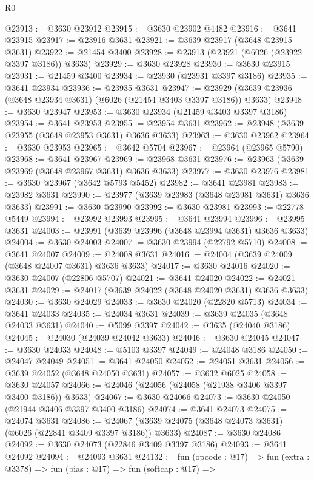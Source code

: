 \begin{lexlean}{R0}
\begin{coremodule}
@23913 := @3630 @23912
@23915 := @3630 @23902 @4482
@23916 := @3641 @23915
@23917 := @23916 @3631
@23921 := @3639 @23917 (@3648 @23915 @3631)
@23922 := @21454 @3400
@23928 := @23913 (@23921 (@6026 (@23922 @3397 @3186)) @3633)
@23929 := @3630 @23928
@23930 := @3630 @23915
@23931 := @21459 @3400
@23934 := @23930 (@23931 @3397 @3186)
@23935 := @3641 @23934
@23936 := @23935 @3631
@23947 := @23929 (@3639 @23936 (@3648 @23934 @3631) (@6026 (@21454 @3403 @3397 @3186)) @3633)
@23948 := @3630 @23947
@23953 := @3630 @23934 (@21459 @3403 @3397 @3186)
@23954 := @3641 @23953
@23955 := @23954 @3631
@23962 := @23948 (@3639 @23955 (@3648 @23953 @3631) @3636 @3633)
@23963 := @3630 @23962
@23964 := @3630 @23953
@23965 := @3642 @5704
@23967 := @23964 (@23965 @5790)
@23968 := @3641 @23967
@23969 := @23968 @3631
@23976 := @23963 (@3639 @23969 (@3648 @23967 @3631) @3636 @3633)
@23977 := @3630 @23976
@23981 := @3630 @23967 (@3642 @5793 @5452)
@23982 := @3641 @23981
@23983 := @23982 @3631
@23990 := @23977 (@3639 @23983 (@3648 @23981 @3631) @3636 @3633)
@23991 := @3630 @23990
@23992 := @3630 @23981
@23993 := @22778 @5449
@23994 := @23992 @23993
@23995 := @3641 @23994
@23996 := @23995 @3631
@24003 := @23991 (@3639 @23996 (@3648 @23994 @3631) @3636 @3633)
@24004 := @3630 @24003
@24007 := @3630 @23994 (@22792 @5710)
@24008 := @3641 @24007
@24009 := @24008 @3631
@24016 := @24004 (@3639 @24009 (@3648 @24007 @3631) @3636 @3633)
@24017 := @3630 @24016
@24020 := @3630 @24007 (@22806 @5707)
@24021 := @3641 @24020
@24022 := @24021 @3631
@24029 := @24017 (@3639 @24022 (@3648 @24020 @3631) @3636 @3633)
@24030 := @3630 @24029
@24033 := @3630 @24020 (@22820 @5713)
@24034 := @3641 @24033
@24035 := @24034 @3631
@24039 := @3639 @24035 (@3648 @24033 @3631)
@24040 := @5099 @3397
@24042 := @3635 (@24040 @3186)
@24045 := @24030 (@24039 @24042 @3633)
@24046 := @3630 @24045
@24047 := @3630 @24033
@24048 := @5103 @3397
@24049 := @24048 @3186
@24050 := @24047 @24049
@24051 := @3641 @24050
@24052 := @24051 @3631
@24056 := @3639 @24052 (@3648 @24050 @3631)
@24057 := @3632 @6025
@24058 := @3630 @24057
@24066 := @24046 (@24056 (@24058 (@21938 @3406 @3397 @3400 @3186)) @3633)
@24067 := @3630 @24066
@24073 := @3630 @24050 (@21944 @3406 @3397 @3400 @3186)
@24074 := @3641 @24073
@24075 := @24074 @3631
@24086 := @24067 (@3639 @24075 (@3648 @24073 @3631) (@6026 (@22841 @3409 @3397 @3186)) @3633)
@24087 := @3630 @24086
@24092 := @3630 @24073 (@22846 @3409 @3397 @3186)
@24093 := @3641 @24092
@24094 := @24093 @3631
@24132 := fun (opcode : @17) =>
  fun (extra : @3378) =>
  fun (bias : @17) =>
  fun (softcap : @17) =>

\end{coremodule}
\end{lexlean}
